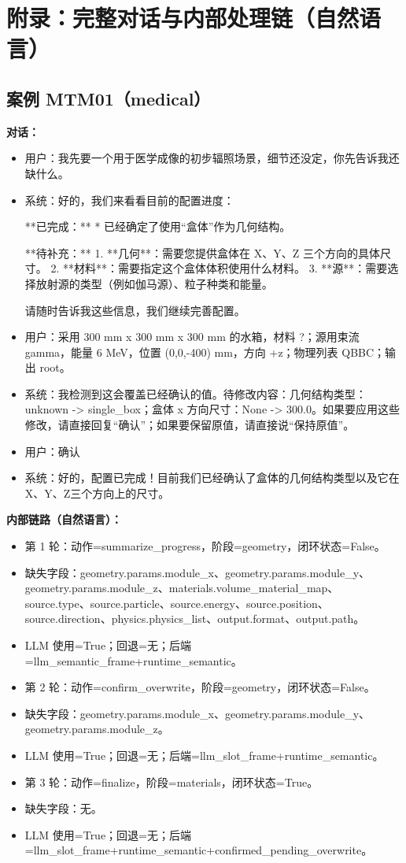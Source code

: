 \documentclass[11pt]{ctexart}
\begin{document}
\section{附录：完整对话与内部处理链（自然语言）}
\subsection{案例 MTM01（medical）}
\textbf{对话：}
\begin{itemize}
\item 用户：我先要一个用于医学成像的初步辐照场景，细节还没定，你先告诉我还缺什么。
\item 系统：好的，我们来看看目前的配置进度：

**已完成：**
*   已经确定了使用“盒体”作为几何结构。

**待补充：**
1.  **几何**：需要您提供盒体在 X、Y、Z 三个方向的具体尺寸。
2.  **材料**：需要指定这个盒体体积使用什么材料。
3.  **源**：需要选择放射源的类型（例如伽马源）、粒子种类和能量。

请随时告诉我这些信息，我们继续完善配置。
\item 用户：采用 300 mm x 300 mm x 300 mm 的水箱，材料 ?；源用束流 gamma，能量 6 MeV，位置 (0,0,-400) mm，方向 +z；物理列表 QBBC；输出 root。
\item 系统：我检测到这会覆盖已经确认的值。待修改内容：几何结构类型：unknown -> single\_box；盒体 x 方向尺寸：None -> 300.0。如果要应用这些修改，请直接回复“确认”；如果要保留原值，请直接说“保持原值”。
\item 用户：确认
\item 系统：好的，配置已完成！目前我们已经确认了盒体的几何结构类型以及它在X、Y、Z三个方向上的尺寸。
\end{itemize}
\textbf{内部链路（自然语言）：}
\begin{itemize}
\item 第 1 轮：动作=summarize\_progress，阶段=geometry，闭环状态=False。
\item 缺失字段：geometry.params.module\_x、geometry.params.module\_y、geometry.params.module\_z、materials.volume\_material\_map、source.type、source.particle、source.energy、source.position、source.direction、physics.physics\_list、output.format、output.path。
\item LLM 使用=True；回退=无；后端=llm\_semantic\_frame+runtime\_semantic。
\item 第 2 轮：动作=confirm\_overwrite，阶段=geometry，闭环状态=False。
\item 缺失字段：geometry.params.module\_x、geometry.params.module\_y、geometry.params.module\_z。
\item LLM 使用=True；回退=无；后端=llm\_slot\_frame+runtime\_semantic。
\item 第 3 轮：动作=finalize，阶段=materials，闭环状态=True。
\item 缺失字段：无。
\item LLM 使用=True；回退=无；后端=llm\_slot\_frame+runtime\_semantic+confirmed\_pending\_overwrite。
\end{itemize}
\end{document}
